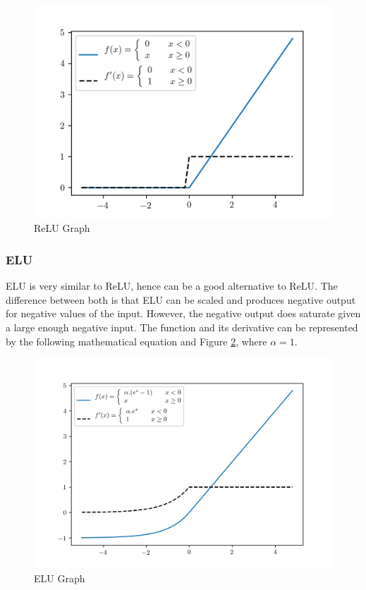 \documentclass{tum-book}
\begin{document}
                \begin{figure}[h]
                    \centering
                    \includegraphics[scale=1]{myFiles/myImages/ReLU.png}
                    \caption{ReLU Graph}
                    \label{fig:ReLU Function}
                \end{figure}

            \subsubsection{ELU}
            ELU is very similar to ReLU, hence can be a good alternative to ReLU. The difference between both is that ELU can be scaled and produces negative output for negative values of the input. However, the negative output does saturate given a large enough negative input. The function and its derivative can be represented by the following mathematical equation and Figure \ref{fig:ELU Function}, where $\alpha = 1$.
            
                \newpage\begin{figure}
                    \centering
                    \includegraphics[scale=0.75]{myFiles/myImages/ELU.png}
                    \caption{ELU Graph}
                    \label{fig:ELU Function}
                \end{figure}
\end{document}
